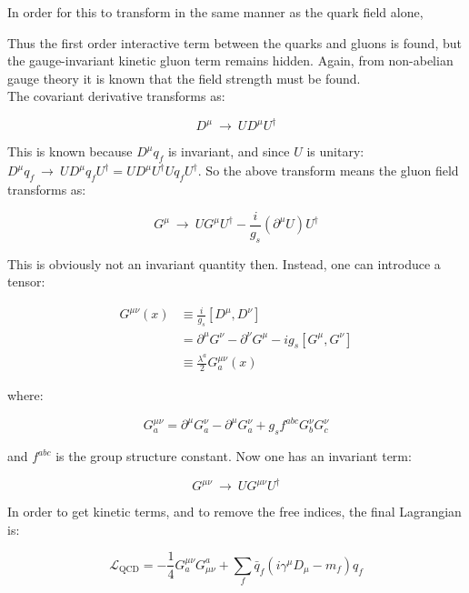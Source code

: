 \documentclass[11pt,a4paper]{article}
\begin{document}
In order for this to transform in the same manner as the quark field alone,

Thus the first order interactive term between the quarks and gluons is found, but the gauge-invariant kinetic gluon term remains hidden. Again, from non-abelian gauge theory it is known that the field strength must be found.\\
The covariant derivative transforms as:

\begin{equation}
	D^\mu \:\rightarrow\: UD^\mu U^\dagger
\end{equation}

This is known because $D^\mu q_f$ is invariant, and since $U$ is unitary:$D^\mu q_f \:\rightarrow\: UD^\mu q_fU^\dagger = UD^\mu U^\dagger U q_fU^\dagger$. So the above transform means the gluon field transforms as:

\begin{equation}
	G^\mu \:\rightarrow\: UG^\mu U^\dagger - \frac{i}{g_s}(\partial^\mu U)U^\dagger
\end{equation}

This is obviously not an invariant quantity then. Instead, one can introduce a tensor:

\begin{align*}
	G^{\mu\nu}(x) &\equiv \frac{i}{g_s}[D^\mu,D^\nu]\\
	&= \partial^\mu G^\nu - \partial^\nu G^\mu - ig_s[G^\mu,G^\nu]\\
	&\equiv \frac{\lambda^a}{2}G_a^{\mu\nu}(x)
\end{align*}

where:

\begin{equation}
	G_a^{\mu\nu} = \partial^\mu G_a^\nu - \partial^\mu G_a^\nu + g_sf^{abc}G_b^\nu G_c^\nu
\end{equation}

and $f^{abc}$ is the group structure constant. Now one has an invariant term:

\begin{equation}
	G^{\mu\nu} \:\rightarrow\: UG^{\mu\nu}U^\dagger
\end{equation}

In order to get kinetic terms, and to remove the free indices, the final Lagrangian is:

\begin{equation}
	\mathcal{L}_{\text{QCD}} = -\frac{1}{4}G_a^{\mu\nu}G_{\mu\nu}^a + \sum_f \bar{q}_f(i\gamma^\mu D_\mu - m_f)q_f
\end{equation}
\end{document}
